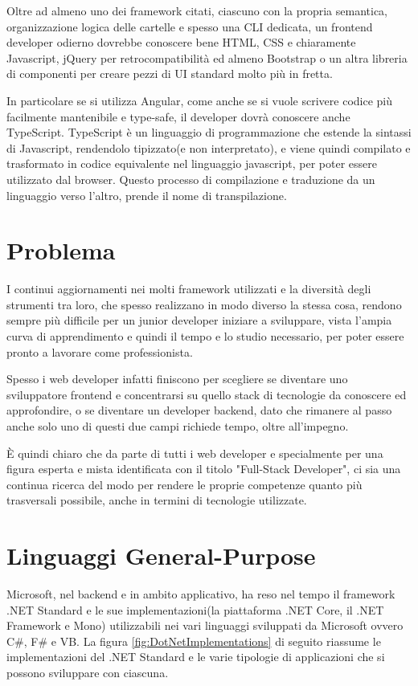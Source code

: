 Oltre ad almeno uno dei framework citati, ciascuno con la propria semantica, organizzazione logica delle cartelle e spesso una CLI dedicata, un frontend developer odierno dovrebbe conoscere bene HTML, CSS e chiaramente Javascript, jQuery per retrocompatibilit\`a ed almeno Bootstrap o un altra libreria di componenti per creare pezzi di UI standard molto pi\`u in fretta.

In particolare se si utilizza Angular, come anche se si vuole scrivere codice pi\`u facilmente mantenibile e type-safe, il developer dovr\`a conoscere anche TypeScript.
TypeScript \`e un linguaggio di programmazione che estende la sintassi di Javascript, rendendolo tipizzato(e non interpretato), e viene quindi compilato e trasformato in codice equivalente nel linguaggio javascript, per poter essere utilizzato dal browser.
Questo processo di compilazione e traduzione da un linguaggio verso l'altro, prende il nome di transpilazione.

\section{Problema}\label{sez:problema}
I continui aggiornamenti nei molti framework utilizzati e la diversit\`a degli strumenti tra loro, che spesso realizzano in modo diverso la stessa cosa, rendono sempre pi\`u difficile per un junior developer iniziare a sviluppare, vista l'ampia curva di apprendimento e quindi il tempo e lo studio necessario, per poter essere pronto a lavorare come professionista.

Spesso i web developer infatti finiscono per scegliere se diventare uno sviluppatore frontend e concentrarsi su quello stack di tecnologie da conoscere ed approfondire, o se diventare un developer backend, dato che rimanere al passo anche solo uno di questi due campi richiede tempo, oltre all'impegno.

\`E quindi chiaro che da parte di tutti i web developer e specialmente per una figura esperta e mista identificata con il titolo "Full-Stack Developer", ci sia una continua ricerca del modo per rendere le proprie competenze quanto pi\`u trasversali possibile, anche in termini di tecnologie utilizzate.

\pagebreak

\section{Linguaggi General-Purpose}\label{sez:linguaggiGeneralPurpose}
Microsoft, nel backend e in ambito applicativo, ha reso nel tempo il framework .NET Standard e le sue implementazioni(la piattaforma .NET Core, il .NET Framework e Mono) utilizzabili nei vari linguaggi sviluppati da Microsoft ovvero C\#, F\# e VB.
La figura \ref{fig:DotNetImplementations} di seguito riassume le implementazioni del .NET Standard e le varie tipologie di applicazioni che si possono sviluppare con ciascuna.

